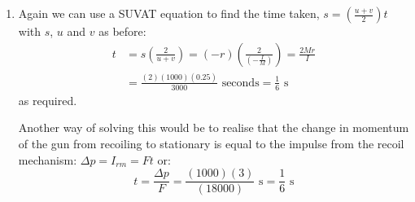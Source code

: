 \begin{problem}[A1972AMIIQ2l]
{\begin{enumerate}
	\item Again we can use a SUVAT equation to find the time taken, $s = \left( \frac{u + v}{2} \right)t$ with $s$, $u$ and $v$ as before:
\begin{align*} 
t &= s \left( \frac{2}{u + v} \right) = (-r) \left( \frac{2}{\left( -\frac{I}{M} \right)} \right) = \frac{2Mr}{I} \\ 
&= \frac{(2)(1000)(0.25)}{3000} \text{ seconds} = \frac{1}{6} \text{ s} 
\end{align*} as required.

Another way of solving this would be to realise that the change in momentum of the gun from recoiling to stationary is equal to the impulse from the recoil mechanism: $ \Delta p = I_{rm} = Ft$ or:
\begin{equation*} 
t = \frac{\Delta p}{F} = \frac{(1000)(3)}{(18000)} \text{ s} = \frac{1}{6} \text{ s}
 \end{equation*}

\end{enumerate}}
\end{problem}